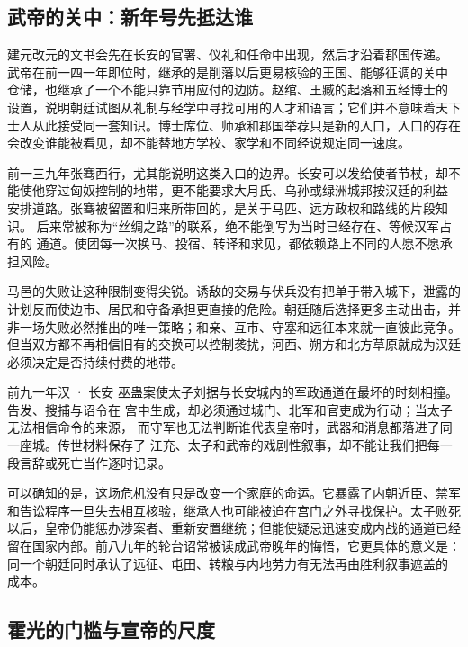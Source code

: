 \subsection{武帝的关中：新年号先抵达谁}

建元改元的文书会先在长安的官署、仪礼和任命中出现，然后才沿着郡国传递。
武帝在前一四一年即位时，继承的是削藩以后更易核验的王国、能够征调的关中
仓储，也继承了一个不能只靠节用应付的边防。赵绾、王臧的起落和五经博士的
设置，说明朝廷试图从礼制与经学中寻找可用的人才和语言；它们并不意味着天下
士人从此接受同一套知识。博士席位、师承和郡国举荐只是新的入口，入口的存在
会改变谁能被看见，却不能替地方学校、家学和不同经说规定同一速度。

前一三九年张骞西行，尤其能说明这类入口的边界。长安可以发给使者节杖，却不
能使他穿过匈奴控制的地带，更不能要求大月氏、乌孙或绿洲城邦按汉廷的利益
安排道路。张骞被留置和归来所带回的，是关于马匹、远方政权和路线的片段知识。
后来常被称为“丝绸之路”的联系，绝不能倒写为当时已经存在、等候汉军占有的
通道。使团每一次换马、投宿、转译和求见，都依赖路上不同的人愿不愿承担风险。

马邑的失败让这种限制变得尖锐。诱敌的交易与伏兵没有把单于带入城下，泄露的
计划反而使边市、居民和守备承担更直接的危险。朝廷随后选择更多主动出击，并
非一场失败必然推出的唯一策略；和亲、互市、守塞和远征本来就一直彼此竞争。
但当双方都不再相信旧有的交换可以控制袭扰，河西、朔方和北方草原就成为汉廷
必须决定是否持续付费的地带。

\begin{event}{}{前九一年}{汉 · 长安}{}
巫蛊案使太子刘据与长安城内的军政通道在最坏的时刻相撞。告发、搜捕与诏令在
宫中生成，却必须通过城门、北军和官吏成为行动；当太子无法相信命令的来源，
而守军也无法判断谁代表皇帝时，武器和消息都落进了同一座城。传世材料保存了
江充、太子和武帝的戏剧性叙事，却不能让我们把每一段言辞或死亡当作逐时记录。

可以确知的是，这场危机没有只是改变一个家庭的命运。它暴露了内朝近臣、禁军
和告讼程序一旦失去相互核验，继承人也可能被迫在宫门之外寻找保护。太子败死
以后，皇帝仍能惩办涉案者、重新安置继统；但能使疑忌迅速变成内战的通道已经
留在国家内部。前八九年的轮台诏常被读成武帝晚年的悔悟，它更具体的意义是：
同一个朝廷同时承认了远征、屯田、转粮与内地劳力有无法再由胜利叙事遮盖的
成本。
\end{event}

\subsection{霍光的门槛与宣帝的尺度}

